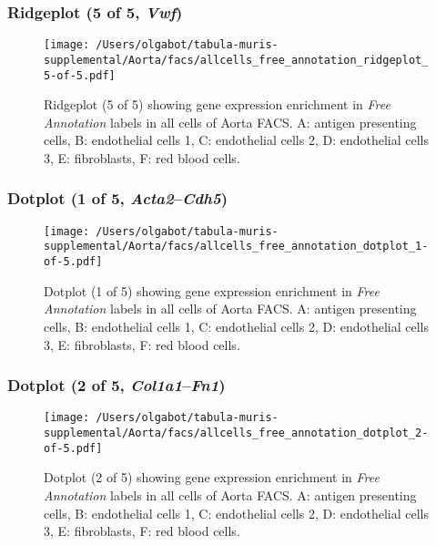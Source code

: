 \clearpage

\subsubsection{Ridgeplot (5 of 5, \emph{Vwf})}
\begin{figure}[h]
\centering
\texttt{[image: /Users/olgabot/tabula-muris-supplemental/Aorta/facs/allcells\_free\_annotation\_ridgeplot\_5-of-5.pdf]}

\caption{ Ridgeplot (5 of 5)  showing gene expression enrichment in \emph{Free Annotation} labels in all cells of Aorta FACS. A: antigen presenting cells, B: endothelial cells 1, C: endothelial cells 2, D: endothelial cells 3, E: fibroblasts, F: red blood cells.}
\end{figure}


\clearpage

\subsubsection{Dotplot (1 of 5, \emph{Acta2}--\emph{Cdh5})}
\begin{figure}[h]
\centering
\texttt{[image: /Users/olgabot/tabula-muris-supplemental/Aorta/facs/allcells\_free\_annotation\_dotplot\_1-of-5.pdf]}

\caption{ Dotplot (1 of 5)  showing gene expression enrichment in \emph{Free Annotation} labels in all cells of Aorta FACS. A: antigen presenting cells, B: endothelial cells 1, C: endothelial cells 2, D: endothelial cells 3, E: fibroblasts, F: red blood cells.}
\end{figure}


\clearpage

\subsubsection{Dotplot (2 of 5, \emph{Col1a1}--\emph{Fn1})}
\begin{figure}[h]
\centering
\texttt{[image: /Users/olgabot/tabula-muris-supplemental/Aorta/facs/allcells\_free\_annotation\_dotplot\_2-of-5.pdf]}

\caption{ Dotplot (2 of 5)  showing gene expression enrichment in \emph{Free Annotation} labels in all cells of Aorta FACS. A: antigen presenting cells, B: endothelial cells 1, C: endothelial cells 2, D: endothelial cells 3, E: fibroblasts, F: red blood cells.}
\end{figure}


